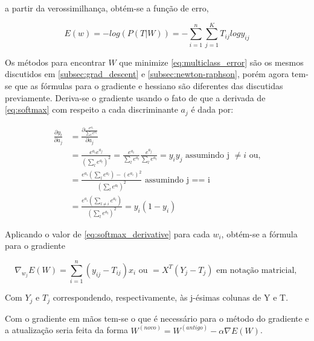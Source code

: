 a partir da verossimilhança, obtém-se a função de erro,

\begin{center}
	\begin{equation}
		\label{eq:multiclass_error}
		E(w) = - log(P(T | W)) = - \sum_{i = 1}^{n} \sum_{j = 1}^{K} T_{ij} log y_{ij}
	\end{equation}
\end{center}

Os métodos para encontrar $W$ que minimize \ref{eq:multiclass_error} são os mesmos discutidos em
\ref{subsec:grad_descent} e \ref{subsec:newton-raphson}, porém agora tem-se que as fórmulas
para o gradiente e hessiano são diferentes das discutidas previamente. Deriva-se o gradiente
usando o fato de que a derivada de \ref{eq:softmax} com respeito a cada discriminante $a_j$
é dada por:


\begin{center}
	\begin{equation}
	\begin{split}\label{eq:softmax_derivative}
		\frac{\partial y_i}{\partial a_j} &= \frac{\partial \frac{e^{a_i}}{\sum_l e^{a_l}}}{\partial a_j}  \\
	& = \frac{e^{a_i}e^{a_j}}{(\sum_l e^{a_l})^2} = \frac{e^{a_i}}{\sum_l e^{a_l}}\frac{e^{a_j}}{\sum_l e^{a_l}} = y_iy_j \text{ assumindo j } \neq i  \text{ ou,}\\
	& = \frac{e^{a_i}(\sum_l e^{a_l}) - (e^{a_i})^2}{(\sum_l e^{a_l})^2} \text{ assumindo j == i} \\
	& = \frac{e^{a_i}(\sum_{l \neq i} e^{a_l})}{(\sum_l e^{a_l})^2} = y_i(1 - y_i)
	\end{split}
	\end{equation}
\end{center}

Aplicando o valor de \ref{eq:softmax_derivative} para cada $w_i$, obtém-se a fórmula para o gradiente

\begin{center}
	\begin{equation}
		\nabla_{w_j} E(W) = \sum_{i =  1}^n (y_{ij} - T_{ij})x_i \text{ ou } = X^T(Y_{j} - T_{j}) \text{ em notação matricial, }
	\end{equation}
\end{center}

Com $Y_j$ e $T_j$ correspondendo, respectivamente, às j-ésimas colunas de Y e T.

Com o gradiente em mãos tem-se o que é necessário para o método do gradiente e a
atualização seria feita da forma $W^{ (novo) } = W^{ (antigo) } - \alpha \nabla E(W)$.

